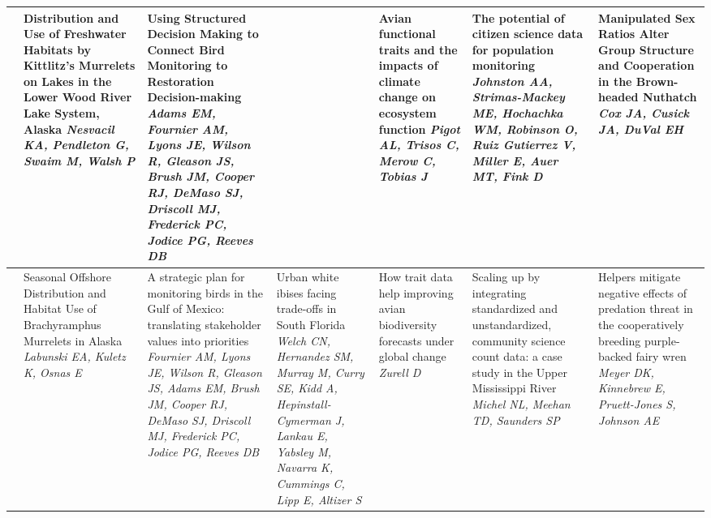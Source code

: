 \begin{tabular}{|x{0.75cm}|a{2.25cm}|a{2.25cm}|a{2.25cm}|a{2.25cm}|a{2.25cm}|x{2.25cm}|}
&Distribution and Use of Freshwater Habitats by Kittlitz’s Murrelets on Lakes in the Lower Wood River Lake System, Alaska \newline \newline \textit{Nesvacil KA, Pendleton G, Swaim M, Walsh P} & Using Structured Decision Making to Connect Bird Monitoring to Restoration Decision-making \newline \newline \textit{Adams EM, Fournier AM, Lyons JE, Wilson R, Gleason JS, Brush JM, Cooper RJ, DeMaso SJ, Driscoll MJ, Frederick PC, Jodice PG, Reeves DB} &  \newline \newline \textit{} & Avian functional traits and the impacts of climate change on ecosystem function \newline \newline \textit{Pigot AL, Trisos C, Merow C, Tobias J} & The potential of citizen science data for population monitoring \newline \newline \textit{Johnston AA, Strimas-Mackey ME, Hochachka WM, Robinson O, Ruiz Gutierrez V, Miller E, Auer MT, Fink D} & Manipulated Sex Ratios Alter Group Structure and Cooperation in the Brown-headed Nuthatch \newline \newline \textit{Cox JA, Cusick JA, DuVal EH}\\
\hline
{}&Seasonal Offshore Distribution and Habitat Use of Brachyramphus Murrelets in Alaska \newline \newline \textit{Labunski EA, Kuletz K, Osnas E} & A strategic plan for monitoring birds in the Gulf of Mexico: translating stakeholder values into priorities \newline \newline \textit{Fournier AM, Lyons JE, Wilson R, Gleason JS, Adams EM, Brush JM, Cooper RJ, DeMaso SJ, Driscoll MJ, Frederick PC, Jodice PG, Reeves DB} & Urban white ibises facing trade-offs in South Florida \newline \newline \textit{Welch CN, Hernandez SM, Murray M, Curry SE, Kidd A, Hepinstall-Cymerman J, Lankau E, Yabsley M, Navarra K, Cummings C, Lipp E, Altizer S} & How trait data help improving avian biodiversity forecasts under global change \newline \newline \textit{Zurell D} & Scaling up by integrating standardized and unstandardized, community science count data: a case study in the Upper Mississippi River \newline \newline \textit{Michel NL, Meehan TD, Saunders SP} & Helpers mitigate negative effects of predation threat in the cooperatively breeding purple-backed fairy wren \newline \newline \textit{Meyer DK, Kinnebrew E, Pruett-Jones S, Johnson AE}\\

\end{tabular}
